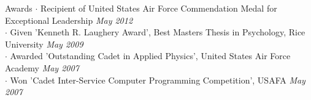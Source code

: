 
\begin{rSection}{Awards}
  $\cdot$ Recipient of United States Air Force Commendation Medal for Exceptional Leadership 
  \hfill {\em May 2012} \\
  $\cdot$ Given 'Kenneth R. Laughery Award', Best Masters Thesis in Psychology, Rice University 
  \hfill {\em May 2009} \\
  $\cdot$ Awarded 'Outstanding Cadet in Applied Physics', United States Air Force Academy 
  \hfill {\em May 2007} \\
  $\cdot$ Won 'Cadet Inter-Service Computer Programming Competition', USAFA 
  \hfill {\em May 2007}
\end{rSection}
